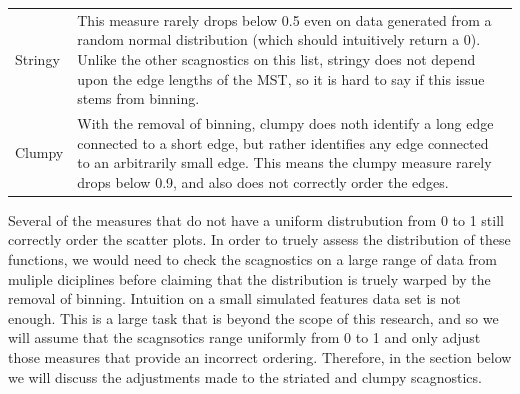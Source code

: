 \begin{Schunk}
\begin{table}
\begin{tabular}[t]{>{\raggedright\arraybackslash}p{3cm}l}
Stringy & This measure rarely drops below 0.5 even on data generated from a random normal distribution (which should intuitively return a 0). Unlike the other scagnostics on this list, stringy does not depend upon the edge lengths of the MST, so it is hard to say if this issue stems from binning.\\
\addlinespace
Clumpy & With the removal of binning, clumpy does noth identify a long edge connected to a short edge, but rather identifies any edge connected to an arbitrarily small edge. This means the clumpy measure rarely drops below 0.9, and also does not correctly order the edges.\\
\bottomrule
\end{tabular}
\end{table}

\end{Schunk}

Several of the measures that do not have a uniform distrubution from 0
to 1 still correctly order the scatter plots. In order to truely assess
the distribution of these functions, we would need to check the
scagnostics on a large range of data from muliple diciplines before
claiming that the distribution is truely warped by the removal of
binning. Intuition on a small simulated features data set is not enough.
This is a large task that is beyond the scope of this research, and so
we will assume that the scagnsotics range uniformly from 0 to 1 and only
adjust those measures that provide an incorrect ordering. Therefore, in
the section below we will discuss the adjustments made to the striated
and clumpy scagnostics.

